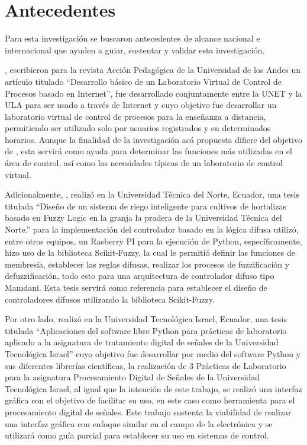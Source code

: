 \section{Antecedentes}
	
	Para esta investigación se buscaron antecedentes de alcance nacional e internacional que ayuden a guiar, sustentar y validar esta investigación.
	
	\textcite{casallas2005desarrollo}, escribieron para la revista Acción Pedagógica de la Universidad de los Andes un artículo titulado \enquote{Desarrollo básico de un Laboratorio Virtual de Control de Procesos basado en Internet}, fue desarrollado conjuntamente entre la UNET y la ULA para ser usado a través de Internet y cuyo objetivo fue desarrollar un laboratorio virtual de control de procesos para la enseñanza a distancia, permitiendo ser utilizado solo por usuarios registrados y en determinados horarios. Aunque la finalidad de la investigación acá propuesta difiere del objetivo de \citeauthor{casallas2005desarrollo}, esta servirá como ayuda para determinar las funciones más utilizadas en el área de control, así como las necesidades típicas de un laboratorio de control virtual.
	
	Adicionalmente, \textcite{salazar2019diseno}, realizó en la Universidad Técnica del Norte, Ecuador, una tesis titulada \enquote{Diseño de un sistema de riego inteligente para cultivos de hortalizas basado en Fuzzy Logic en la granja la pradera de la Universidad Técnica del Norte.} para la implementación del controlador basado en la lógica difusa utilizó, entre otros equipos, un Rasberry PI para la ejecución de Python, específicamente, hizo uso de la biblioteca Scikit-Fuzzy, la cual le permitió definir las funciones de membresía, establecer las reglas difusas, realizar los procesos de fuzzificación y defuzzificación, todo esto para una arquitectura de controlador difuso tipo Mamdani. Esta tesis servirá como referencia para establecer el diseño de controladores difusos utilizando la biblioteca Scikit-Fuzzy.

	Por otro lado, \textcite{congo2018aplicaciones} realizó en la Universidad Tecnológica Israel, Ecuador, una tesis titulada \enquote{Aplicaciones del software libre Python para prácticas de laboratorio aplicado a la asignatura de tratamiento digital de señales de la Universidad Tecnológica Israel} cuyo objetivo fue desarrollar por medio del software Python y sus diferentes librerías científicas, la realización de 3 Prácticas de Laboratorio para la asignatura Procesamiento Digital de Señales de la Universidad Tecnológica Israel, al igual que la intención de este trabajo, se realizó una interfaz gráfica con el objetivo de facilitar su uso, en este caso como herramienta para el procesamiento digital de señales. Este trabajo sustenta la viabilidad de realizar una interfaz gráfica con enfoque similar en el campo de la electrónica y se utilizará como guía parcial para establecer su uso en sistemas de control.
	
